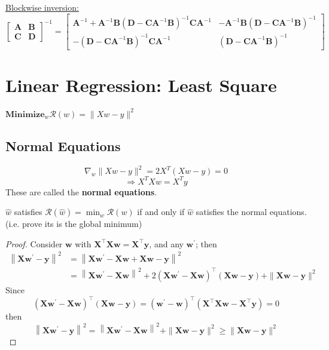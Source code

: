 \documentclass[11pt]{elegantbook}
\begin{document}
\underline{Blockwise inversion: }$$
{\displaystyle {\begin{bmatrix}\mathbf {A} &\mathbf {B} \\\mathbf {C} &\mathbf {D} \end{bmatrix}}^{-1}={\begin{bmatrix}\mathbf {A} ^{-1}+\mathbf {A} ^{-1}\mathbf {B} \left(\mathbf {D} -\mathbf {CA} ^{-1}\mathbf {B} \right)^{-1}\mathbf {CA} ^{-1}&-\mathbf {A} ^{-1}\mathbf {B} \left(\mathbf {D} -\mathbf {CA} ^{-1}\mathbf {B} \right)^{-1}\\-\left(\mathbf {D} -\mathbf {CA} ^{-1}\mathbf {B} \right)^{-1}\mathbf {CA} ^{-1}&\left(\mathbf {D} -\mathbf {CA} ^{-1}\mathbf {B} \right)^{-1}\end{bmatrix}}}
$$







\section{Linear Regression: Least Square}
$\textbf{Minimize}_w \mathcal{R}(w)=\|Xw-y\|^2$
\subsection{Normal Equations}
$$\nabla_w\|Xw-y\|^2=2X^T(Xw-y)=0$$
$$\Rightarrow X^TXw=X^Ty$$
These are called the \textbf{normal equations}.
\begin{proposition}
    $\hat{w}$ satisfies $\mathcal{R}(\hat{w})=\min_w\mathcal{R}(w)$ if and only if $\hat{w}$ satisfies the normal equations. (i.e. prove its is the global minimum)
\end{proposition}
\begin{proof}
Consider $\boldsymbol{w}$ with $\boldsymbol{X}^{\top} \boldsymbol{X} \boldsymbol{w}=\boldsymbol{X}^{\top} \boldsymbol{y}$, and any $\boldsymbol{w}^{\prime}$; then $$\begin{aligned}\left\|\boldsymbol{X} \boldsymbol{w}^{\prime}-\boldsymbol{y}\right\|^{2} &=\left\|\boldsymbol{X} \boldsymbol{w}^{\prime}-\boldsymbol{X} \boldsymbol{w}+\boldsymbol{X} \boldsymbol{w}-\boldsymbol{y}\right\|^{2} \\ &=\left\|\boldsymbol{X} \boldsymbol{w}^{\prime}-\boldsymbol{X} \boldsymbol{w}\right\|^{2}+2\left(\boldsymbol{X} \boldsymbol{w}^{\prime}-\boldsymbol{X} \boldsymbol{w}\right)^{\top}(\boldsymbol{X} \boldsymbol{w}-\boldsymbol{y})+\|\boldsymbol{X} \boldsymbol{w}-\boldsymbol{y}\|^{2} \end{aligned}$$
Since
$$
\left(\boldsymbol{X} \boldsymbol{w}^{\prime}-\boldsymbol{X} \boldsymbol{w}\right)^{\top}(\boldsymbol{X} \boldsymbol{w}-\boldsymbol{y})=\left(\boldsymbol{w}^{\prime}-\boldsymbol{w}\right)^{\top}\left(\boldsymbol{X}^{\top} \boldsymbol{X} \boldsymbol{w}-\boldsymbol{X}^{\top} \boldsymbol{y}\right)=0
$$
then
$$
\left\|\boldsymbol{X} \boldsymbol{w}^{\prime}-\boldsymbol{y}\right\|^{2}=\left\|\boldsymbol{X} \boldsymbol{w}^{\prime}-\boldsymbol{X} \boldsymbol{w}\right\|^{2}+\|\boldsymbol{X} \boldsymbol{w}-\boldsymbol{y}\|^{2} \geq\|\boldsymbol{X} \boldsymbol{w}-\boldsymbol{y}\|^{2}
$$
\end{proof}
\end{document}
